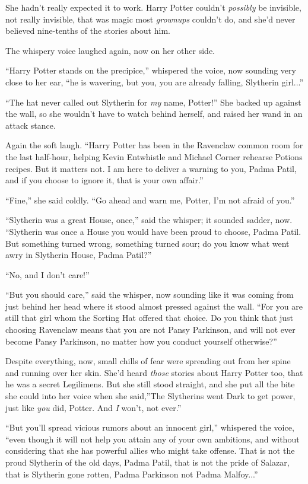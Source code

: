 She hadn't really expected it to work. Harry Potter couldn't
\emph{possibly} be invisible, not really invisible, that was magic most
\emph{grownups} couldn't do, and she'd never believed nine-tenths of the
stories about him.

The whispery voice laughed again, now on her other side.

``Harry Potter stands on the precipice,'' whispered the voice, now
sounding very close to her ear, ``he is wavering, but you, you are
already falling, Slytherin girl...''

``The hat never called out Slytherin for \emph{my} name, Potter!'' She
backed up against the wall, so she wouldn't have to watch behind
herself, and raised her wand in an attack stance.

Again the soft laugh. ``Harry Potter has been in the Ravenclaw common
room for the last half-hour, helping Kevin Entwhistle and Michael Corner
rehearse Potions recipes. But it matters not. I am here to deliver a
warning to you, Padma Patil, and if you choose to ignore it, that is
your own affair.''

``Fine,'' she said coldly. ``Go ahead and warn me, Potter, I'm not
afraid of you.''

``Slytherin was a great House, once,'' said the whisper; it sounded
sadder, now. ``Slytherin was once a House you would have been proud to
choose, Padma Patil. But something turned wrong, something turned sour;
do you know what went awry in Slytherin House, Padma Patil?''

``No, and I don't care!''

``But you should care,'' said the whisper, now sounding like it was
coming from just behind her head where it stood almost pressed against
the wall. ``For you are still that girl whom the Sorting Hat offered
that choice. Do you think that just choosing Ravenclaw means that you
are not Pansy Parkinson, and will not ever become Pansy Parkinson, no
matter how you conduct yourself otherwise?''

Despite everything, now, small chills of fear were spreading out from
her spine and running over her skin. She'd heard \emph{those} stories
about Harry Potter too, that he was a secret Legilimens. But she still
stood straight, and she put all the bite she could into her voice when
she said,''The Slytherins went Dark to get power, just like \emph{you}
did, Potter. And \emph{I} won't, not ever.''

``But you'll spread vicious rumors about an innocent girl,'' whispered
the voice, ``even though it will not help you attain any of your own
ambitions, and without considering that she has powerful allies who
might take offense. That is not the proud Slytherin of the old days,
Padma Patil, that is not the pride of Salazar, that is Slytherin gone
rotten, Padma Parkinson not Padma Malfoy...''

